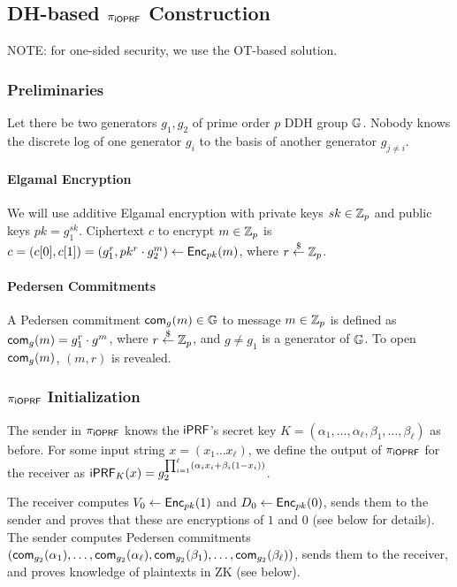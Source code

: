 \subsection{DH-based ${\pi_{\mathsf{i}\mathsf{OPRF}}}$ Construction}
NOTE: for one-sided security, we use the OT-based solution.


\subsubsection{Preliminaries}
Let there be two generators $g_1,g_2$ of prime order $p$ DDH group
$\mathbb{G}$. Nobody knows the discrete log of one generator $g_i$ to the
basis of another generator $g_{j\neq{}i}$.

\paragraph{Elgamal Encryption}
We will use additive Elgamal encryption with private keys $sk\in\mathbb{Z}_p$
and public keys $pk=g_1^{sk}$. Ciphertext $c$ to encrypt $m\in\mathbb{Z}_p$ is
$c=(c[0],c[1])=(g_1^r,pk^r\cdot{}g_2^m)\leftarrow{\mathsf{Enc}}_{pk}(m)$, where
$r\stackrel{\$}{\leftarrow}\mathbb{Z}_p$.

\paragraph{Pedersen Commitments}
A Pedersen commitment $\mathsf{com}_{g}(m)\in\mathbb{G}$ to message $m\in\mathbb{Z}_p$ is defined as
$\mathsf{com}_{g}(m)=g_1^r\cdot{}g^m$, where $r\stackrel{\$}{\leftarrow}\mathbb{Z}_p$, and $g\neq{}g_1$ is
a generator of $\mathbb{G}$.  To open $\mathsf{com}_{g}(m)$, $(m,r)$ is revealed.


\subsubsection{${\pi_{\mathsf{i}\mathsf{OPRF}}}$ Initialization}
The sender in ${\pi_{\mathsf{i}\mathsf{OPRF}}}$ knows the $\mathsf{i}\mathsf{PRF}$'s secret key
$K=(\alpha_1,\ldots,\alpha_\ell,\beta_1,\ldots,\beta_\ell)$ as before. For some input
string $x=(x_1\ldots{}x_\ell)$, we define the output of ${\pi_{\mathsf{i}\mathsf{OPRF}}}$ for
the receiver as
$\mathsf{i}\mathsf{PRF}_K(x)=g_2^{\prod_{i=1}^{\ell}(\alpha_i{}x_i+\beta_i(1-x_i))}$.

The receiver computes $V_0 \leftarrow{\mathsf{Enc}}_{pk}(1)$ and
$D_0\leftarrow{\mathsf{Enc}}_{pk}(0)$, sends them to the sender and proves that
these are encryptions of $1$ and $0$ (see below for details). The
sender computes Pedersen commitments
$(\mathsf{com}_{g_2}(\alpha_1),\ldots,\mathsf{com}_{g_2}(\alpha_\ell),\mathsf{com}_{g_2}(\beta_1),\ldots,\mathsf{com}_{g_2}(\beta_\ell))$,
sends them to the receiver, and proves knowledge of plaintexts in ZK
(see below).

